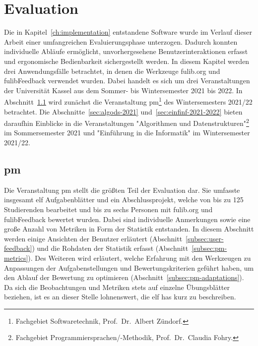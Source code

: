 \chapter{Evaluation}\label{ch:evaluation}

Die in Kapitel~\ref{ch:implementation} entstandene Software wurde im Verlauf dieser Arbeit einer umfangreichen Evaluierungsphase unterzogen.
Dadurch konnten individuelle Abläufe ermöglicht, unvorhergesehene Benutzerinteraktionen erfasst und ergonomische Bedienbarkeit sichergestellt werden.
In diesem Kapitel werden drei Anwendungsfälle betrachtet, in denen die Werkzeuge fulib.org und fulibFeedback verwendet wurden.
Dabei handelt es sich um drei Veranstaltungen der Universität Kassel aus dem Sommer- bis Wintersemester 2021 bis 2022.
In Abschnitt~\ref{sec:pm-2021-2022} wird zunächst die Veranstaltung \ac{pm}\footnote{
    Fachgebiet Softwaretechnik, Prof.\ Dr.\ Albert Zündorf.
} des Wintersemesters 2021/22 betrachtet.
Die Abschnitte~\ref{sec:algods-2021} und~\ref{sec:einfinf-2021-2022} bieten daraufhin Einblicke in die Veranstaltungen "Algorithmen und Datenstrukturen"\footnote{
    Fachgebiet Programmiersprachen/-Methodik, Prof.\ Dr.\ Claudia Fohry.\label{fn:fg-plm}
} im Sommersemester 2021 und "Einführung in die Informatik" im Wintersemester 2021/22.


\section{\acl{pm}}\label{sec:pm-2021-2022}

Die Veranstaltung \ac{pm} stellt die größten Teil der Evaluation dar.
Sie umfasste insgesamt elf Aufgabenblätter und ein Abschlussprojekt, welche von bis zu 125 Studierenden bearbeitet und bis zu sechs Personen mit fulib.org und fulibFeedback bewertet wurden.
Dabei sind individuelle Anmerkungen sowie eine große Anzahl von Metriken in Form der Statistik entstanden.
In diesem Abschnitt werden einige Ansichten der Benutzer erläutert (Abschnitt~\ref{subsec:user-feedback}) und die Rohdaten der Statistik erfasst (Abschnitt~\ref{subsec:pm-metrics}).
Des Weiteren wird erläutert, welche Erfahrung mit den Werkzeugen zu Anpassungen der Aufgabenstellungen und Bewertungskriterien geführt haben, um den Ablauf der Bewertung zu optimieren (Abschnitt~\ref{subsec:pm-adaptations}).
Da sich die Beobachtungen und Metriken stets auf einzelne Übungsblätter beziehen, ist es an dieser Stelle lohnenswert, die elf \acp{ha} kurz zu beschreiben.

